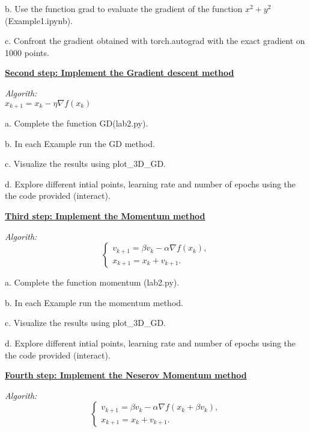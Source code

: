 \documentclass{article}
\newcommand{\step}[1]{\underline{\textbf{\large{#1}}} }
\begin{document}
    b. Use the function grad to evaluate the gradient of the function $x^2+y^2$ (Example1.ipynb).

    c. Confront the gradient obtained with torch.autograd with the exact gradient on 1000 points. 

    \begin{center}\step{Second step: Implement the Gradient descent method}\end{center}
    
    \begin{center}\textit{Algorith:} \\ $x_{k+1} = x_{k} - \eta \nabla f(x_{k})$ \end{center}

    a. Complete the function GD(lab2.py).

    b. In each Example run the GD method.

    c. Visualize the results using plot\_3D\_GD.

    d. Explore different intial points, learning rate and number of epochs using the the code provided (interact).

  \begin{center}\step{Third step: Implement the Momentum method}\end{center}
    
  \begin{center}\textit{Algorith:} 
    \begin{equation*}
      \begin{cases*}
        v_{k+1} = \beta v_k  -\alpha \nabla f(x_k),\\
        x_{k+1} = x_k + v_{k+1}.
      \end{cases*}
    \end{equation*}
  \end{center}
  \newpage
  \restoregeometry
    a. Complete the function momentum (lab2.py).

    b. In each Example run the momentum method.

    c. Visualize the results using plot\_3D\_GD.

    d. Explore different intial points, learning rate and number of epochs using the the code provided (interact).

\begin{center}\step{Fourth step: Implement the Neserov Momentum method}\end{center}
  \begin{center}\textit{Algorith:} 
    \begin{equation*}
      \begin{cases*}
        v_{k+1} = \beta v_k  -\alpha \nabla f(x_k + \beta v_k),\\
        x_{k+1} = x_k + v_{k+1}.
      \end{cases*}
    \end{equation*}
  \end{center} 
\end{document}
